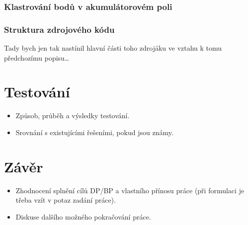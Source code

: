 \documentclass[11pt,twoside,a4paper]{book}
\begin{document}
\subsection{Klastrování bodů v akumulátorovém poli}


\subsection{Struktura zdrojového kódu}

Tady bych jen tak nastínil hlavní části toho zdrojáku ve vztahu k tomu předchozímu popisu\ldots

\chapter{Testování}
\label{chap:test}

\begin{itemize}
 \item Způsob, průběh a výsledky testování.
 \item Srovnání s existujícími řešeními, pokud jsou známy.
\end{itemize} 


\chapter{Závěr}

\begin{itemize}
\item Zhodnocení splnění cílů DP/BP a  vlastního přínosu práce (při formulaci je třeba vzít v potaz zadání práce).
\item Diskuse dalšího možného pokračování práce.
\end{itemize} 


%

\end{document}
